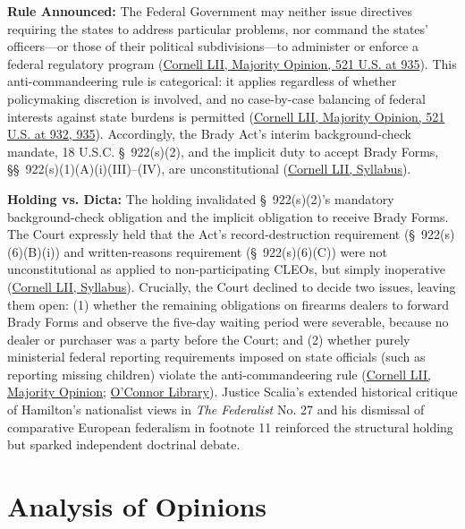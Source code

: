 \documentclass[12pt]{article}
\begin{document}
\textbf{Rule Announced:} The Federal Government may neither issue directives requiring the states to address particular problems, nor command the states' officers---or those of their political subdivisions---to administer or enforce a federal regulatory program (\href{https://www.law.cornell.edu/supct/html/95-1478.ZO.html}{Cornell LII, Majority Opinion, 521 U.S. at 935}). This anti-commandeering rule is categorical: it applies regardless of whether policymaking discretion is involved, and no case-by-case balancing of federal interests against state burdens is permitted (\href{https://www.law.cornell.edu/supct/html/95-1478.ZO.html}{Cornell LII, Majority Opinion, 521 U.S. at 932, 935}). Accordingly, the Brady Act's interim background-check mandate, 18 U.S.C. \S\ 922(s)(2), and the implicit duty to accept Brady Forms, \S\S\ 922(s)(1)(A)(i)(III)--(IV), are unconstitutional (\href{https://www.law.cornell.edu/supct/html/95-1478.ZS.html}{Cornell LII, Syllabus}).

\textbf{Holding vs. Dicta:} The holding invalidated \S\ 922(s)(2)'s mandatory background-check obligation and the implicit obligation to receive Brady Forms. The Court expressly held that the Act's record-destruction requirement (\S\ 922(s)(6)(B)(i)) and written-reasons requirement (\S\ 922(s)(6)(C)) were not unconstitutional as applied to non-participating CLEOs, but simply inoperative (\href{https://www.law.cornell.edu/supct/html/95-1478.ZS.html}{Cornell LII, Syllabus}). Crucially, the Court declined to decide two issues, leaving them open: (1) whether the remaining obligations on firearms dealers to forward Brady Forms and observe the five-day waiting period were severable, because no dealer or purchaser was a party before the Court; and (2) whether purely ministerial federal reporting requirements imposed on state officials (such as reporting missing children) violate the anti-commandeering rule (\href{https://www.law.cornell.edu/supct/html/95-1478.ZO.html}{Cornell LII, Majority Opinion}; \href{https://library.oconnorinstitute.org/supreme-court/printz-v-united-states-1996/}{O'Connor Library}). Justice Scalia's extended historical critique of Hamilton's nationalist views in \textit{The Federalist} No. 27 and his dismissal of comparative European federalism in footnote 11 reinforced the structural holding but sparked independent doctrinal debate.

\section{Analysis of Opinions}
\end{document}
